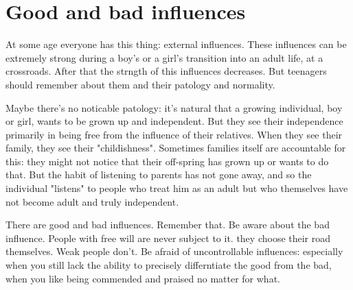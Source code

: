 \chapter{Good and bad influences}

At some age everyone has this thing: external influences. These influences can be extremely strong during a boy's or a girl's transition into an adult life, at a crossroads. After that the strngth of this influences decreases. But teenagers should remember about them and their patology and normality.

Maybe there's no noticable patology: it's natural that a growing individual, boy or girl,  wants to be grown up and independent. But they see their independence primarily in being free from the influence of their relatives. When they see their family, they see their "childishness". Sometimes families itself are accountable for this: they might not notice that their off-spring has grown up or wants to do that. But the habit of listening to parents has not gone away, and so the individual "listens" to people who treat him as an adult but who themselves have not become adult and truly independent.

There are good and bad influences. Remember that. Be aware about the bad influence. People with free will are never subject to it. they choose their road themselves. Weak people don't. Be afraid of uncontrollable influences: especially when you still lack the ability to precisely differntiate the good from the bad, when you like being commended and praised no matter for what.